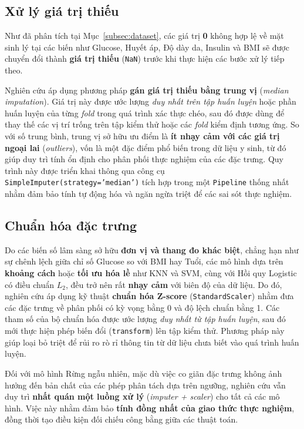 \documentclass[14pt,a4paper]{extreport}
\begin{document}
\subsection{Xử lý giá trị thiếu}

Như đã phân tích tại Mục~\ref{subsec:dataset}, các giá trị \textbf{0} không hợp lệ về mặt sinh lý tại các biến như Glucose, Huyết áp, Độ dày da, Insulin và BMI sẽ được chuyển đổi thành \textbf{giá trị thiếu} (\texttt{NaN}) trước khi thực hiện các bước xử lý tiếp theo.

Nghiên cứu áp dụng phương pháp \textbf{gán giá trị thiếu bằng trung vị} (\textit{median imputation}). Giá trị này được ước lượng \emph{duy nhất trên tập huấn luyện} hoặc phần huấn luyện của từng \textit{fold} trong quá trình xác thực chéo, sau đó được dùng để thay thế các vị trí trống trên tập kiểm thử hoặc các \textit{fold} kiểm định tương ứng. So với số trung bình, trung vị sở hữu ưu điểm là \textbf{ít nhạy cảm với các giá trị ngoại lai} (\textit{outliers}), vốn là một đặc điểm phổ biến trong dữ liệu y sinh, từ đó giúp duy trì tính ổn định cho phân phối thực nghiệm của các đặc trưng. Quy trình này được triển khai thông qua công cụ \texttt{SimpleImputer(strategy='median')} tích hợp trong một \texttt{Pipeline} thống nhất nhằm đảm bảo tính tự động hóa và ngăn ngừa triệt để các sai sót thực nghiệm.

\subsection{Chuẩn hóa đặc trưng}

Do các biến số lâm sàng sở hữu \textbf{đơn vị và thang đo khác biệt}, chẳng hạn như sự chênh lệch giữa chỉ số Glucose so với BMI hay Tuổi, các mô hình dựa trên \textbf{khoảng cách} hoặc \textbf{tối ưu hóa lề} như KNN và SVM, cùng với Hồi quy Logistic có điều chuẩn $L_2$, đều trở nên rất \textbf{nhạy cảm} với biên độ của dữ liệu. Do đó, nghiên cứu áp dụng kỹ thuật \textbf{chuẩn hóa Z-score} (\texttt{StandardScaler}) nhằm đưa các đặc trưng về phân phối có kỳ vọng bằng 0 và độ lệch chuẩn bằng 1. Các tham số của bộ chuẩn hóa được ước lượng \emph{duy nhất từ tập huấn luyện}, sau đó mới thực hiện phép biến đổi (\texttt{transform}) lên tập kiểm thử. Phương pháp này giúp loại bỏ triệt để rủi ro rò rỉ thông tin từ dữ liệu chưa biết vào quá trình huấn luyện.\cite{pedregosa2011}

Đối với mô hình Rừng ngẫu nhiên, mặc dù việc co giãn đặc trưng không ảnh hưởng đến bản chất của các phép phân tách dựa trên ngưỡng, nghiên cứu vẫn duy trì \textbf{nhất quán một luồng xử lý} (\textit{imputer + scaler}) cho tất cả các mô hình. Việc này nhằm đảm bảo \textbf{tính đồng nhất của giao thức thực nghiệm}, đồng thời tạo điều kiện đối chiếu công bằng giữa các thuật toán.
\end{document}
